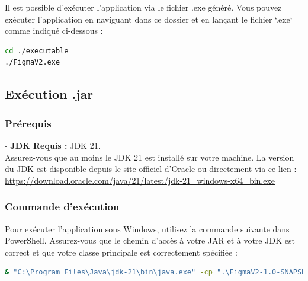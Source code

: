 \documentclass[a4paper,11pt]{article}
\begin{document}
Il est possible d'exécuter l'application via le fichier .exe généré. Vous pouvez exécuter l'application en naviguant dans ce dossier et en lançant le fichier `.exe` comme indiqué ci-dessous :


\begin{lstlisting}[language=bash,caption={Command execution .exe}]
cd ./executable
./FigmaV2.exe
\end{lstlisting}

\subsection{Exécution .jar}
\subsubsection{Prérequis}

- \textbf{JDK Requis :} JDK 21.\\ Assurez-vous que au moins le JDK 21 est installé sur votre machine. La version du JDK est disponible depuis le site officiel d'Oracle ou directement via ce lien : \url{https://download.oracle.com/java/21/latest/jdk-21_windows-x64_bin.exe}

\subsubsection{Commande d'exécution}

Pour exécuter l'application sous Windows, utilisez la commande suivante dans PowerShell. Assurez-vous que le chemin d'accès à votre JAR et à votre JDK est correct et que votre classe principale est correctement spécifiée :

\begin{lstlisting}[language=bash,caption={Command execution .jar}]
& "C:\Program Files\Java\jdk-21\bin\java.exe" -cp ".\FigmaV2-1.0-SNAPSHOT.jar" thibault.kuraima.Main
\end{lstlisting}

\pagebreak


\end{document}
